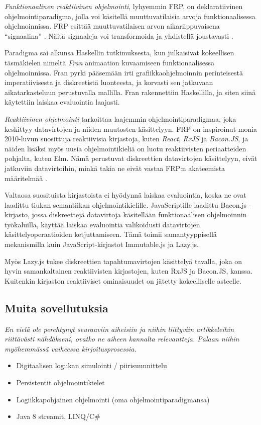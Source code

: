\textit{Funktionaalinen reaktiivinen ohjelmointi}, lyhyemmin FRP, on deklaratiivinen ohjelmointiparadigma, jolla voi käsitellä muuttuvatilaisia arvoja funktionaalisessa ohjelmoinnissa. FRP esittää muuttuvatilaisen arvon aikariippuvaisena ``signaalina'' . Näitä signaaleja voi transformoida ja yhdistellä joustavasti \citep{czaplicki2012elm}.

Paradigma sai alkunsa Haskellin tutkimuksesta, kun \citet{elliott1997functional} julkaisivat kokeellisen täsmäkielen nimeltä \textit{Fran} animaation kuvaamiseen funktionaalisessa ohjelmoinnissa. Fran pyrki pääsemään irti grafiikkaohjelmoinnin perinteisestä  imperatiivisesta ja diskreetistä luonteesta, ja korvasti sen jatkuvaan aikatarkasteluun perustuvalla mallilla. Fran rakennettiin Haskellilla, ja siten siinä käytettiin laiskaa evaluointia laajasti.

\textit{Reaktiivinen ohjelmointi} tarkoittaa laajemmin ohjelmointiparadigmaa, joka keskittyy datavirtojen ja niiden muutosten käsittelyyn. FRP on inspiroinut monia 2010-luvun suosittuja reaktiivisia kirjastoja, kuten \textit{React}, \textit{RxJS} ja \textit{Bacon.JS}, ja näiden lisäksi myös uusia ohjelmointikieliä on luotu reaktiivisten periaatteiden pohjalta, kuten Elm. Nämä perustuvat diskreettien datavirtojen käsittelyyn, eivät jatkuviin datavirtoihin, minkä takia ne eivät vastaa FRP:n akateemista määritelmää \citep{whyprogramwithconttime}.

Valtaosa suosituista kirjastoista ei hyödynnä laiskaa evaluointia, koska ne ovat laadittu tiukan semantiikan ohjelmointikielille. JavaScriptille laadittu Bacon.js -kirjasto, jossa diskreettejä datavirtoja käsitellään funktionaalisen ohjelmoinnin työkaluilla, käyttää laiskaa evaluointia valikoidusti datavirtojen käsittelyoperaatioiden ketjuttamiseen. Tämä toimii samantyyppisellä mekanismilla kuin JavaScript-kirjastot Immutable.js ja Lazy.js.

Myös Lazy.js tukee diskreettien tapahtumavirtojen käsittelyä tavalla, joka on hyvin samankaltainen reaktiivisten kirjastojen, kuten RxJS ja Bacon.JS, kanssa. Kuitenkin kirjaston reaktiiviset ominaisuudet on jätetty kokeelliselle asteelle.

\subsection{Muita sovellutuksia}

\textit{En vielä ole perehtynyt seuraaviin aiheisiin ja niihin liittyviin artikkeleihin riittävästi nähdäkseni, ovatko ne aiheen kannalta relevantteja. Palaan niihin myöhemmässä vaiheessa kirjoitusprosessia.  }
\begin{itemize}
  \item{Digitaalisen logiikan simulointi / piirisuunnittelu \citep{charlton1991lazy}}
  \item{Persistentit ohjelmointikielet \citep{wevers2014persistent}}
  \item{Logiikkapohjainen ohjelmointi (oma ohjelmointiparadigmansa) \citep{alpuente1997specialization}}
  \item{Java 8 streamit, LINQ/C\#}
\end{itemize}
